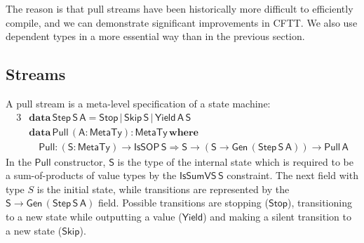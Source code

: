 \documentclass[acmsmall,screen,review,anonymous]{acmart}
\newcommand{\mit}[1]{{\mathsf{#1}}}
\newcommand{\msf}[1]{{\mathsf{#1}}}
\newcommand{\mbf}[1]{{\mathbf{#1}}}
\newcommand{\ind}{\hspace{1em}}
\newcommand{\data}{\mbf{data}\,}
\newcommand{\where}{\mbf{where}}
\newcommand{\vA}{\mathsf{A}}
\newcommand{\vS}{\mathsf{S}}
\newcommand{\IsSOP}{\msf{IsSOP}}
\newcommand{\MTy}{\msf{MetaTy}}
\theoremstyle{remark}
\newcommand{\Gen}{\msf{Gen}}
\newcommand{\RA}{\Rightarrow}
\newcommand{\Stop}{\msf{Stop}}
\newcommand{\Skip}{\msf{Skip}}
\newcommand{\Yield}{\msf{Yield}}
\newcommand{\IsSumVS}{\msf{IsSumVS}}
\newcommand{\Step}{\msf{Step}}
\newcommand{\Pull}{\msf{Pull}}
\begin{document}
The reason is that pull streams have been historically more difficult to
efficiently compile, and we can demonstrate significant improvements in CFTT.
We also use dependent types in a more essential way than in the previous
section.



\subsection{Streams}

A pull stream is a meta-level specification of a state machine:
\begin{alignat*}{3}
  & \data \Step\,\vS\,\vA = \Stop\,|\,\Skip\,\vS\,|\,\Yield\,\vA\,\vS\\
  & \data \Pull\,(\vA : \MTy) : \MTy\,\where\\
  & \ind \Pull : (\vS : \MTy) \to \IsSOP\,\vS \RA \vS \to (\vS \to \Gen\,(\Step\,\vS\,\vA)) \to \Pull\,\vA
\end{alignat*}
In the $\Pull$ constructor, $\vS$ is the type of the internal state which is
required to be a sum-of-products of value types by the $\IsSumVS\,\vS$
constraint. The next field with type $S$ is the initial state, while transitions
are represented by the $\vS \to \Gen\,(\Step\,\vS\,\vA)$ field. Possible transitions
are stopping ($\Stop$), transitioning to a new state while outputting a value
($\Yield$) and making a silent transition to a new state ($\Skip$).
\end{document}
